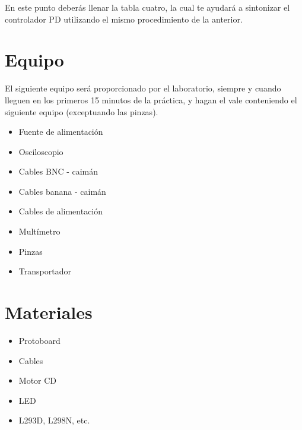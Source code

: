 		\begin{fullwidth}
			\begin{multicols}{2}
				
			\end{multicols}
		\end{fullwidth}

		En este punto deberás llenar la tabla cuatro, la cual te ayudará a sintonizar el controlador PD utilizando el mismo procedimiento de la anterior.


\section{Equipo}

	El siguiente equipo será proporcionado por el laboratorio, siempre y cuando lleguen en los primeros 15 minutos de la práctica, y hagan el vale conteniendo el siguiente equipo (exceptuando las pinzas).

	\begin{itemize}
		\item Fuente de alimentación
		\item Osciloscopio
		\item Cables BNC - caimán
		\item Cables banana - caimán
		\item Cables de alimentación
		\item Multímetro
		\item Pinzas
		\item Transportador
	\end{itemize}


\section{Materiales}

	\begin{itemize}
		\item Protoboard
		\item Cables
		\item Motor CD
		\item LED
		\item L293D, L298N, etc.
	\end{itemize}

